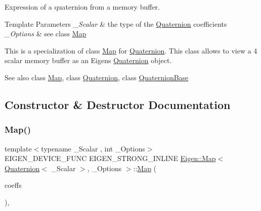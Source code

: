 Expression of a quaternion from a memory buffer. 


\begin{DoxyTemplParams}{Template Parameters}
{\em \+\_\+\+Scalar} & the type of the \mbox{\hyperlink{class_eigen_1_1_quaternion}{Quaternion}} coefficients \\
\hline
{\em \+\_\+\+Options} & see class \mbox{\hyperlink{class_eigen_1_1_map}{Map}}\\
\hline
\end{DoxyTemplParams}
This is a specialization of class \mbox{\hyperlink{class_eigen_1_1_map}{Map}} for \mbox{\hyperlink{class_eigen_1_1_quaternion}{Quaternion}}. This class allows to view a 4 scalar memory buffer as an Eigen\textquotesingle{}s \mbox{\hyperlink{class_eigen_1_1_quaternion}{Quaternion}} object.

\begin{DoxySeeAlso}{See also}
class \mbox{\hyperlink{class_eigen_1_1_map}{Map}}, class \mbox{\hyperlink{class_eigen_1_1_quaternion}{Quaternion}}, class \mbox{\hyperlink{class_eigen_1_1_quaternion_base}{Quaternion\+Base}} 
\end{DoxySeeAlso}


\subsection{Constructor \& Destructor Documentation}
\mbox{\label{class_eigen_1_1_map_3_01_quaternion_3_01___scalar_01_4_00_01___options_01_4_ad94fc6daefd48cccb87aef782e0949e5}} 
\subsubsection{\texorpdfstring{Map()}{Map()}}
{\footnotesize\ttfamily template$<$typename \+\_\+\+Scalar , int \+\_\+\+Options$>$ \\
E\+I\+G\+E\+N\+\_\+\+D\+E\+V\+I\+C\+E\+\_\+\+F\+U\+NC E\+I\+G\+E\+N\+\_\+\+S\+T\+R\+O\+N\+G\+\_\+\+I\+N\+L\+I\+NE \mbox{\hyperlink{class_eigen_1_1_map}{Eigen\+::\+Map}}$<$ \mbox{\hyperlink{class_eigen_1_1_quaternion}{Quaternion}}$<$ \+\_\+\+Scalar $>$, \+\_\+\+Options $>$\+::\mbox{\hyperlink{class_eigen_1_1_map}{Map}} (\begin{DoxyParamCaption}\item[{Scalar $\ast$}]{coeffs }\end{DoxyParamCaption})\hspace{0.3cm}{\ttfamily [inline]}, {\ttfamily [explicit]}}

